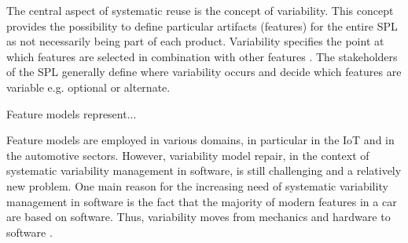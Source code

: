 \documentclass [a4paper, 12pt, twoside]{report}
\theoremstyle{plain}
\theoremstyle{definition}
\theoremstyle{remark}
\theoremstyle{plain}
\theoremstyle{plain}
\theoremstyle{remark}
\begin{document}
The central aspect of systematic reuse is the concept of variability. This concept provides the possibility to define particular artifacts (features) for the entire SPL as not necessarily being part of each product. Variability specifies the point at which features are selected in combination with other features \cite{CE00}. The stakeholders of the SPL generally define where variability occurs and decide which features are variable e.g. optional or alternate.

Feature models represent... 

Feature models are employed in various domains, in particular in the IoT and in the automotive sectors.
However, variability model repair, in the context of systematic variability management in software, is still challenging and a relatively new problem.
One main reason for the increasing need of systematic variability management in software is the fact that the majority of modern features in a car are based on software. Thus, variability moves from mechanics and hardware to software \cite{bosch_spl_nokia,oster_feature_2011}.


\end{document}
